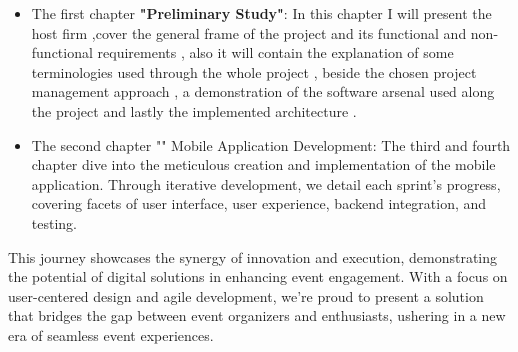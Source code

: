 \begin{large}
\begin{itemize}
    \item The first chapter \textbf{"Preliminary Study"}: In this chapter I will present the host firm ,cover the  general frame of the project  and its functional and non-functional requirements , also it will contain the explanation of some terminologies used through the whole project , beside the chosen project management approach , a demonstration of the software arsenal used along the project and lastly the implemented architecture .
\end{itemize}


\begin{itemize}
    \item The second chapter "" Mobile Application Development: The third and fourth chapter dive into the meticulous creation and implementation of the mobile application. Through iterative development, we detail each sprint's progress, covering facets of user interface, user experience, backend integration, and testing.
\end{itemize}




This journey showcases the synergy of innovation and execution, demonstrating the potential of digital solutions in enhancing event engagement. With a focus on user-centered design and agile development, we're proud to present a solution that bridges the gap between event organizers and enthusiasts, ushering in a new era of seamless event experiences.


\end{large}









